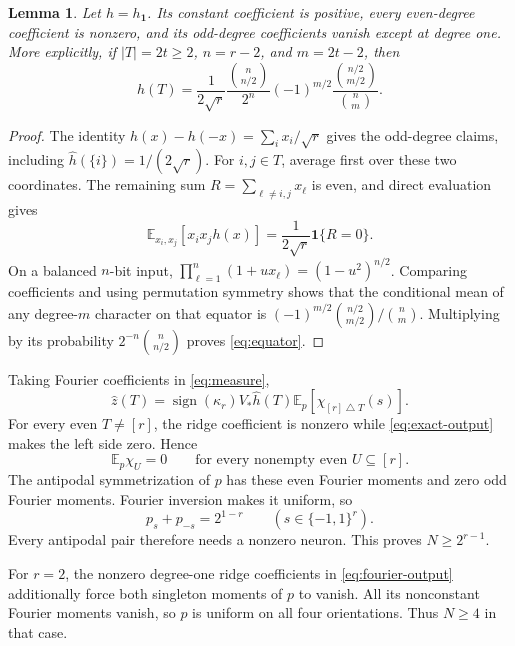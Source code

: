\documentclass[11pt]{article}
\newtheorem{lemma}[theorem]{Lemma}
\newcommand{\E}{\mathbb E}
\begin{document}
\begin{lemma}\label{lem:ridge}
Let $h=h_{\boldsymbol1}$. Its constant coefficient is positive, every
even-degree coefficient is nonzero, and its odd-degree coefficients
vanish except at degree one.
More explicitly, if $|T|=2t\ge2$, $n=r-2$, and $m=2t-2$, then
\begin{equation}\label{eq:equator}
 \widehat h(T)=
 \frac1{2\sqrt r}\frac{\binom n{n/2}}{2^n}
 (-1)^{m/2}\frac{\binom{n/2}{m/2}}{\binom nm}.
\end{equation}
\end{lemma}
\begin{proof}
The identity $h(x)-h(-x)=\sum_i x_i/\sqrt r$ gives the odd-degree
claims, including $\widehat h(\{i\})=1/(2\sqrt r)$.
For $i,j\in T$, average first over these two coordinates. The remaining
sum $R=\sum_{\ell\ne i,j}x_\ell$ is even, and direct evaluation gives
\[
 \E_{x_i,x_j}[x_ix_jh(x)]
 =\frac1{2\sqrt r}\mathbf1\{R=0\}.
\]
On a balanced $n$-bit input,
$\prod_{\ell=1}^n(1+u x_\ell)=(1-u^2)^{n/2}$.
Comparing coefficients and using permutation symmetry shows that the
conditional mean of any degree-$m$ character on that equator is
$(-1)^{m/2}\binom{n/2}{m/2}/\binom nm$. Multiplying by its probability
$2^{-n}\binom n{n/2}$ proves \eqref{eq:equator}.
\end{proof}

Taking Fourier coefficients in \eqref{eq:measure},
\begin{equation}\label{eq:fourier-output}
 \widehat z(T)=\operatorname{sign}(\kappa_r)V_*\widehat h(T)
      \E_p[\chi_{[r]\mathbin\triangle T}(s)].
\end{equation}
For every even $T\ne[r]$, the ridge coefficient is nonzero while
\eqref{eq:exact-output} makes the left side zero. Hence
\[
 \E_p\chi_U=0\qquad\text{for every nonempty even }U\subseteq[r].
\]
The antipodal symmetrization of $p$ has these even Fourier moments and
zero odd Fourier moments. Fourier inversion makes it uniform, so
\begin{equation}\label{eq:pair-mass}
 p_s+p_{-s}=2^{1-r}\qquad(s\in\{-1,1\}^r).
\end{equation}
Every antipodal pair therefore needs a nonzero neuron. This proves
$N\ge2^{r-1}$.

For $r=2$, the nonzero degree-one ridge coefficients in
\eqref{eq:fourier-output} additionally force both singleton moments of
$p$ to vanish. All its nonconstant Fourier moments vanish, so $p$ is
uniform on all four orientations. Thus $N\ge4$ in that case.
\end{document}
